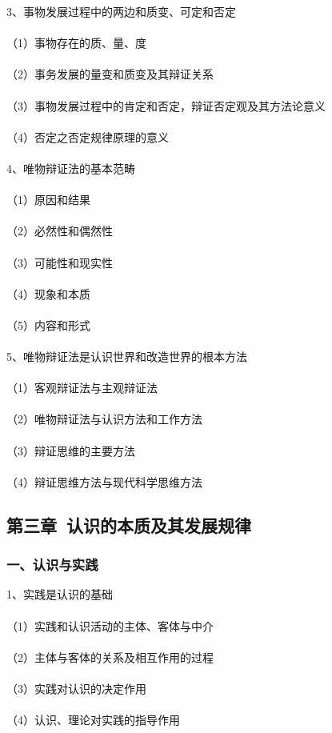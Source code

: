 \documentclass{ctexart}
\begin{document}
3、事物发展过程中的两边和质变、可定和否定
\\\\
（1）事物存在的质、量、度
\\\\
（2）事务发展的量变和质变及其辩证关系
\\\\
（3）事物发展过程中的肯定和否定，辩证否定观及其方法论意义
\\\\
（4）否定之否定规律原理的意义
\\\\

4、唯物辩证法的基本范畴
\\\\
（1）原因和结果
\\\\
（2）必然性和偶然性
\\\\
（3）可能性和现实性
\\\\
（4）现象和本质
\\\\
（5）内容和形式
\\\\

5、唯物辩证法是认识世界和改造世界的根本方法
\\\\
（1）客观辩证法与主观辩证法
\\\\
（2）唯物辩证法与认识方法和工作方法
\\\\
（3）辩证思维的主要方法
\\\\
（4）辩证思维方法与现代科学思维方法
\subsection{第三章\ 认识的本质及其发展规律}
\subsubsection{一、认识与实践}
1、实践是认识的基础
\\\\
（1）实践和认识活动的主体、客体与中介
\\\\
（2）主体与客体的关系及相互作用的过程
\\\\
（3）实践对认识的决定作用
\\\\
（4）认识、理论对实践的指导作用
\\\\
\end{document}

